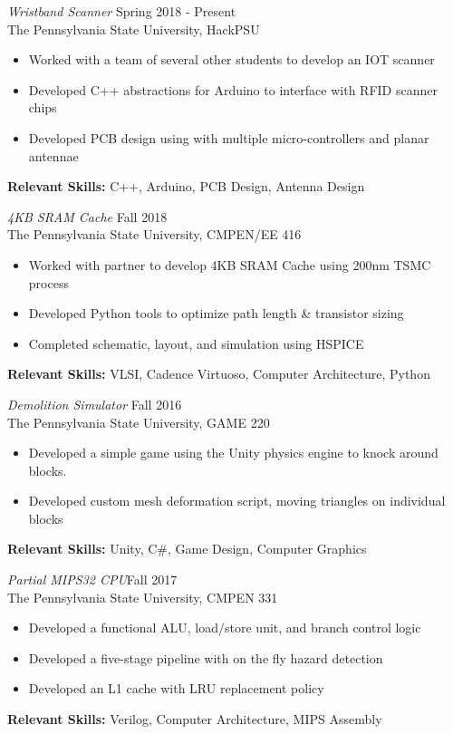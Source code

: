 \documentclass[line,margin]{res}
\begin{document}
\begin{resume}
		{\sl Wristband Scanner} \hfill Spring 2018 - Present\\
		The Pennsylvania State University, HackPSU
		\begin{itemize}  \itemsep -2pt
			\item Worked with a team of several other students to develop an IOT scanner
			\item Developed C++ abstractions for Arduino to interface with RFID scanner chips
			\item Developed PCB design using with multiple micro-controllers and planar antennae
			\vspace*{-\baselineskip}		
		\end{itemize}
		\textbf{Relevant Skills:} C++, Arduino, PCB Design, Antenna Design
		
		{\sl 4KB SRAM Cache} \hfill Fall 2018\\
		The Pennsylvania State University, CMPEN/EE 416
		\begin{itemize}  \itemsep -2pt
			\item Worked with partner to develop 4KB SRAM Cache using 200nm TSMC process
			\item Developed Python tools to optimize path length \& transistor sizing
			\item Completed schematic, layout, and simulation using HSPICE
			\vspace*{-\baselineskip}		
		\end{itemize}
		\textbf{Relevant Skills:} VLSI, Cadence Virtuoso, Computer Architecture, Python
		
		{\sl Demolition Simulator} \hfill Fall 2016\\
		The Pennsylvania State University, GAME 220
		\begin{itemize}  \itemsep -2pt
			\item Developed a simple game using the Unity physics engine to knock around blocks.
			\item Developed custom mesh deformation script, moving triangles on individual blocks
			\vspace*{-\baselineskip}		
		\end{itemize}
		\textbf{Relevant Skills:} Unity, C\#, Game Design, Computer Graphics
		
		{\sl Partial MIPS32 CPU}\hfill Fall 2017\\
		The Pennsylvania State University, CMPEN 331
		\begin{itemize}  \itemsep -2pt
			\item Developed a functional ALU, load/store unit, and branch control logic
			\item Developed a five-stage pipeline with on the fly hazard detection
			\item Developed an L1 cache with LRU replacement policy
			\vspace*{-\baselineskip}		
		\end{itemize}
		\textbf{Relevant Skills:} Verilog, Computer Architecture, MIPS Assembly 
		

\end{resume}
\end{document}
